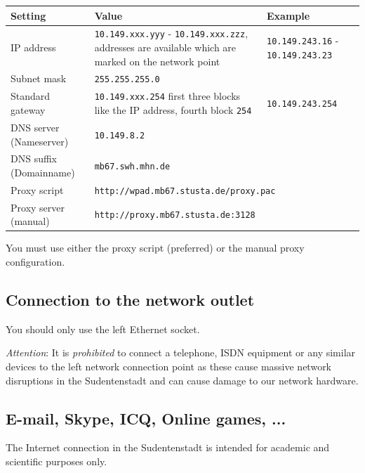 \documentclass[a4paper,12pt]{scrartcl}
\begin{document}
\begin{center}
  \begin{tabularx}{\linewidth}{|lXp{.2\linewidth}|}
    \hline
    Setting & Value & Example \\
    \hline \hline
    IP address & \nolinkurl{10.149.xxx.yyy} - \nolinkurl{10.149.xxx.zzz}, \newline 8 addresses are available which are marked on the network point & \nolinkurl{10.149.243.16} - \nolinkurl{10.149.243.23} \\
    \hline
    Subnet mask & \nolinkurl{255.255.255.0} & \\
    \hline
    Standard gateway & \nolinkurl{10.149.xxx.254} \newline first three blocks like the IP address, fourth block \nolinkurl{254} & \nolinkurl{10.149.243.254} \\
    \hline
    DNS server (Nameserver) & \nolinkurl{10.149.8.2} & \\
    \hline
    DNS suffix (Domainname) & \nolinkurl{mb67.swh.mhn.de} & \\
    \hline
    Proxy script & \multicolumn{2}{l|}{\nolinkurl{http://wpad.mb67.stusta.de/proxy.pac}} \\
    \hline
    Proxy server (manual) & \multicolumn{2}{l|}{\nolinkurl{http://proxy.mb67.stusta.de:3128}} \\
    \hline
  \end{tabularx}
\end{center}

You must use either the proxy script (preferred) or the manual proxy configuration.

\subsection*{Connection to the network outlet}

You should only use the left Ethernet socket.

\emph{Attention}: It is \emph{prohibited} to connect a telephone, ISDN equipment or any similar devices to the left network connection point as these cause massive network disruptions in the Sudentenstadt and can cause damage to our network hardware.

\subsection*{E-mail, Skype, ICQ, Online games, ...}

The Internet connection in the Sudentenstadt is intended for academic and scientific purposes only.
\end{document}
